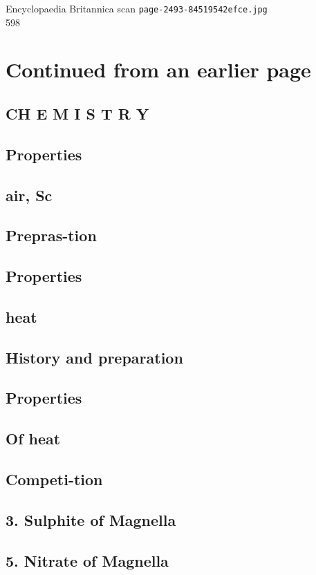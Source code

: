 \documentclass{article}
\begin{document}
\begin{center}
{\Large Encyclopaedia Britannica scan \texttt{page-2493-84519542efce.jpg}}\\[0.5em]
598
\end{center}
\section*{Continued from an earlier page}
\subsection*{CH E M I S T R Y}
\subsection*{Properties}
\subsection*{air, Sc}
\subsection*{Prepras-tion}
\subsection*{Properties}
\subsection*{heat}
\subsection*{History and preparation}
\subsection*{Properties}
\subsection*{Of heat}
\subsection*{Competi-tion}
\subsection*{3. Sulphite of Magnella}
\subsection*{5. Nitrate of Magnella}
\end{document}

